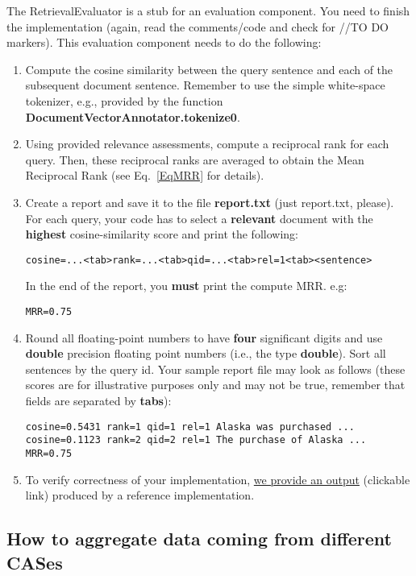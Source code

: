 \documentclass[oneside,11pt]{memoir}
\begin{document}
The RetrievalEvaluator is a stub for an evaluation component. 
You need to finish the implementation
(again, read the comments/code and check for //TO DO markers).
This evaluation component needs to do the following:
\begin{enumerate}
\item Compute the cosine similarity between the query sentence and each of the subsequent
document sentence. Remember to use the
simple white-space tokenizer, e.g.,
provided by the function \textbf{DocumentVectorAnnotator.tokenize0}.
\item Using provided relevance assessments, compute a reciprocal rank for each query.
Then, these reciprocal ranks are averaged to obtain the Mean Reciprocal Rank (see Eq.~\ref{EqMRR} for details).
\item Create a report and save it to the file \textbf{report.txt} (just report.txt, please). 
For each query, your code has to select a \textbf{relevant} document with the
\textbf{highest} cosine-similarity score and print the following:
\begin{verbatim}
cosine=...<tab>rank=...<tab>qid=...<tab>rel=1<tab><sentence>
\end{verbatim}
In the end of the report, you \textbf{must} print the compute MRR. e.g:
\begin{verbatim}
MRR=0.75
\end{verbatim}
\item Round all floating-point numbers to have \textbf{four} significant digits
and use \textbf{double} precision floating point numbers (i.e., the type \textbf{double}).
Sort all sentences by the query id.
Your sample report file may look as follows (these scores are for illustrative purposes only 
and may not be true, remember that fields are separated by \textbf{tabs}):
\begin{verbatim}
cosine=0.5431 rank=1 qid=1 rel=1 Alaska was purchased ...
cosine=0.1123 rank=2 qid=2 rel=1 The purchase of Alaska ...
MRR=0.75
\end{verbatim}
\item To verify correctness of your implementation,
\href{https://raw.githubusercontent.com/amaiberg/software-engineering-preliminary/master/src/retrieval-error-analysis/sample_report1_5.txt}{we provide an output} (clickable link) produced
by a reference implementation.
\end{enumerate}

\begingroup
\renewcommand{\cleardoublepage}{}
\renewcommand{\clearpage}{}
\subsection{How to aggregate data coming from different CASes} 
\endgroup
\end{document}
